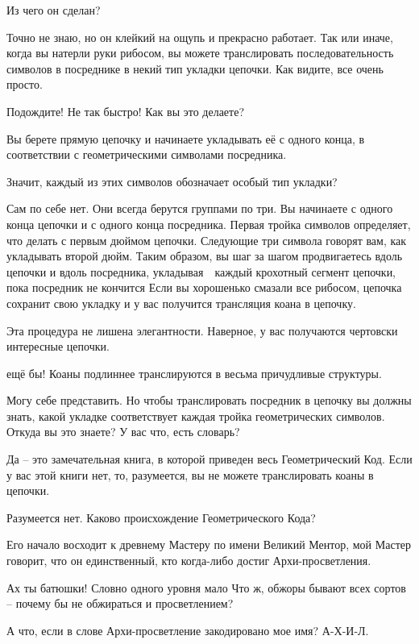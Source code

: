 \documentclass[../main.tex]{subfiles}
\begin{document}
\begin{dialogue}
 Из чего он сделан?

 Точно не знаю, но он клейкий на ощупь и прекрасно работает. Так или иначе, когда вы натерли руки рибосом, вы можете транслировать последовательность символов в посреднике в некий тип укладки цепочки. Как видите, все очень просто.

 Подождите! Не так быстро! Как вы это делаете?

 Вы берете прямую цепочку и начинаете укладывать её с одного конца, в соответствии с геометрическими символами посредника.

 Значит, каждый из этих символов обозначает особый тип укладки?

 Сам по себе нет. Они всегда берутся группами по три. Вы начинаете с одного конца цепочки и с одного конца посредника. Первая тройка символов определяет, что делать с первым дюймом цепочки. Следующие три символа говорят вам, как укладывать второй дюйм. Таким образом, вы шаг за шагом продвигаетесь вдоль цепочки и вдоль посредника, укладывая~~каждый крохотный сегмент цепочки, пока посредник не кончится Если вы хорошенько смазали все рибосом, цепочка сохранит свою укладку и у вас получится трансляция коана в цепочку.

 Эта процедура не лишена элегантности. Наверное, у вас получаются чертовски интересные цепочки.

 ещё бы! Коаны подлиннее транслируются в весьма причудливые структуры.

 Могу себе представить. Но чтобы транслировать посредник в цепочку вы должны знать, какой укладке соответствует каждая тройка геометрических символов. Откуда вы это знаете? У вас что, есть словарь?

 Да \--- это замечательная книга, в которой приведен весь Геометрический Код. Если у вас этой книги нет, то, разумеется, вы не можете транслировать коаны в цепочки.

 Разумеется нет. Каково происхождение Геометрического Кода?

 Его начало восходит к древнему Мастеру по имени Великий Ментор, мой Мастер говорит, что он единственный, кто когда-либо достиг Архи-просветления.

 Ах ты батюшки! Словно одного уровня мало Что ж, обжоры бывают всех сортов \--- почему бы не обжираться и просветлением?

 А что, если в слове Архи-просветление закодировано мое имя? \mbox{А-Х-И-Л}.


\end{dialogue}
\end{document}
